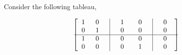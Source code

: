 \begin{example}
	Consider the following tableau,
	
	\begin{equation}
		\begin{bmatrix}
			\hspace{2mm} 1 & \hspace{2mm} 0 \hspace{2mm} & \vline & \hspace{2mm}  1 \hspace{2mm} & \hspace{2mm} 0 \hspace{2mm} & \vline & \hspace{2mm} 0 \hspace{4mm} \\
			\hspace{2mm} 0 & \hspace{2mm} 1 \hspace{2mm} & \vline & \hspace{2mm} 0 \hspace{2mm} & \hspace{2mm} 0 \hspace{2mm} & \vline & \hspace{2mm} 0 \hspace{4mm} \\
			\hline
			\hspace{2mm} 1 & \hspace{2mm} 0 \hspace{2mm} & \vline & \hspace{2mm} 0 \hspace{2mm} & \hspace{2mm} 0 \hspace{2mm} & \vline & \hspace{2mm} 0 \hspace{4mm} \\
			\hspace{2mm} 0 & \hspace{2mm} 0 \hspace{2mm} & \vline & \hspace{2mm} 0 \hspace{2mm} & \hspace{2mm} 1 \hspace{2mm} & \vline & \hspace{2mm} 0 \hspace{4mm} \\
			
		\end{bmatrix}
	\end{equation}
	

\end{example}
